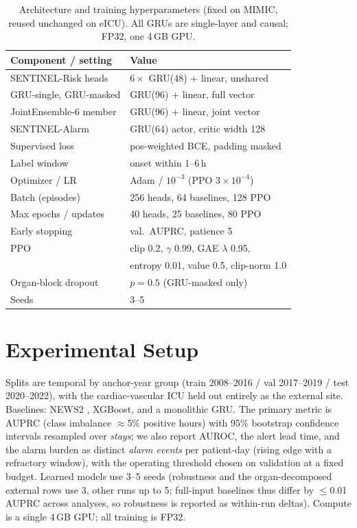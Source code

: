 \documentclass[conference]{IEEEtran}
\begin{document}
\begin{table}[t]
\caption{Architecture and training hyperparameters (fixed on MIMIC, reused
unchanged on eICU). All GRUs are single-layer and causal; FP32, one 4\,GB GPU.}
\label{tab:hyper}
\centering\footnotesize\setlength{\tabcolsep}{4pt}
\begin{tabular}{ll}
\toprule
Component / setting & Value \\
\midrule
SENTINEL-Risk heads & $6\times$ GRU(48) + linear, unshared \\
GRU-single, GRU-masked & GRU(96) + linear, full vector \\
JointEnsemble-6 member & GRU(96) + linear, joint vector \\
SENTINEL-Alarm & GRU(64) actor, critic width 128 \\
\midrule
Supervised loss & pos-weighted BCE, padding masked \\
Label window & onset within 1--6\,h \\
Optimizer / LR & Adam / $10^{-3}$ (PPO $3{\times}10^{-4}$) \\
Batch (episodes) & 256 heads, 64 baselines, 128 PPO \\
Max epochs / updates & 40 heads, 25 baselines, 80 PPO \\
Early stopping & val.\ AUPRC, patience 5 \\
PPO & clip 0.2, $\gamma$ 0.99, GAE $\lambda$ 0.95, \\
 & entropy 0.01, value 0.5, clip-norm 1.0 \\
Organ-block dropout & $p{=}0.5$ (GRU-masked only) \\
Seeds & 3--5 \\
\bottomrule
\end{tabular}
\end{table}

\section{Experimental Setup}
Splits are temporal by anchor-year group (train 2008--2016 / val 2017--2019 / test
2020--2022), with the cardiac-vascular ICU held out entirely as the external site.
Baselines: NEWS2 \cite{rcp2017news2}, XGBoost, and a monolithic GRU. The primary
metric is AUPRC (class imbalance $\approx$5\% positive hours) with 95\% bootstrap
confidence intervals resampled over \emph{stays}; we also report AUROC, the alert
lead time, and the alarm burden as distinct \emph{alarm events} per patient-day
(rising edge with a refractory window), with the operating threshold chosen on
validation at a fixed budget. Learned models use 3--5 seeds (robustness and the organ-decomposed
external rows use 3, other runs up to 5; full-input baselines thus differ by
$\leq$0.01 AUPRC across analyses, so robustness is reported as within-run deltas).
Compute is a single
4\,GB GPU; all training is FP32.
\end{document}
